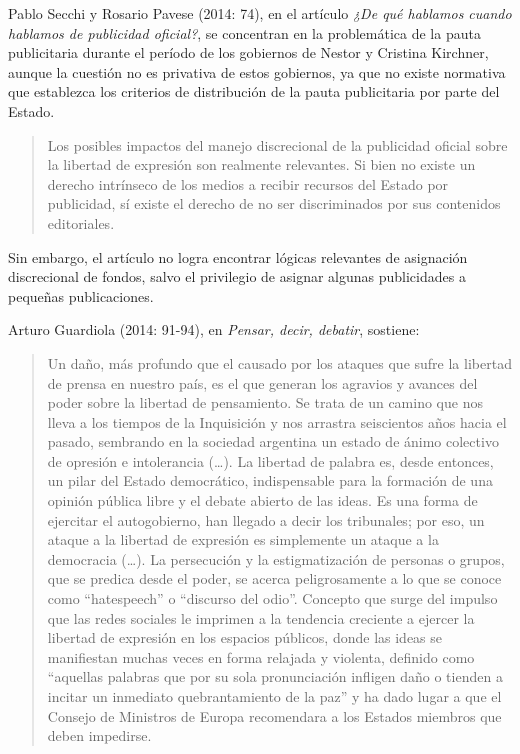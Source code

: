 {Pablo Secchi y Rosario Pavese (2014: 74), en el artículo \emph{¿De qué hablamos cuando hablamos de publicidad oficial?}, se concentran en la problemática de la pauta publicitaria durante el período de los gobiernos de Nestor y Cristina Kirchner, aunque la cuestión no es privativa de estos gobiernos, ya que no existe normativa que establezca los criterios de distribución de la pauta publicitaria por parte del Estado.

\begin{quote}
Los posibles impactos del manejo discrecional de la publicidad oficial sobre la libertad de expresión son realmente relevantes. Si bien no existe un derecho intrínseco de los medios a recibir recursos del Estado por publicidad, sí existe el derecho de no ser discriminados por sus contenidos editoriales.
\end{quote}

Sin embargo, el artículo no logra encontrar lógicas relevantes de asignación discrecional de fondos, salvo el privilegio de asignar algunas publicidades a pequeñas publicaciones.

Arturo Guardiola (2014: 91-94), en \emph{Pensar, decir, debatir}, sostiene:

\begin{quote}
Un daño, más profundo que el causado por los ataques que sufre la libertad de prensa en nuestro país, es el que generan los agravios y avances del poder sobre la libertad de pensamiento. Se trata de un camino que nos lleva a los tiempos de la Inquisición y nos arrastra seiscientos años hacia el pasado, sembrando en la sociedad argentina un estado de ánimo colectivo de opresión e intolerancia (\ldots). La libertad de palabra es, desde entonces, un pilar del Estado democrático, indispensable para la formación de una opinión pública libre y el debate abierto de las ideas. Es una forma de ejercitar el autogobierno, han llegado a decir los tribunales; por eso, un ataque a la libertad de expresión es simplemente un ataque a la democracia (\ldots). La persecución y la estigmatización de personas o grupos, que se predica desde el poder, se acerca peligrosamente a lo que se conoce como ``hatespeech'' o ``discurso del odio''. Concepto que surge del impulso que las redes sociales le imprimen a la tendencia creciente a ejercer la libertad de expresión en los espacios públicos, donde las ideas se manifiestan muchas veces en forma relajada y violenta, definido como ``aquellas palabras que por su sola pronunciación infligen daño o tienden a incitar un inmediato quebrantamiento de la paz'' y ha dado lugar a que el Consejo de Ministros de Europa recomendara a los Estados miembros que deben impedirse.
\end{quote}

}
